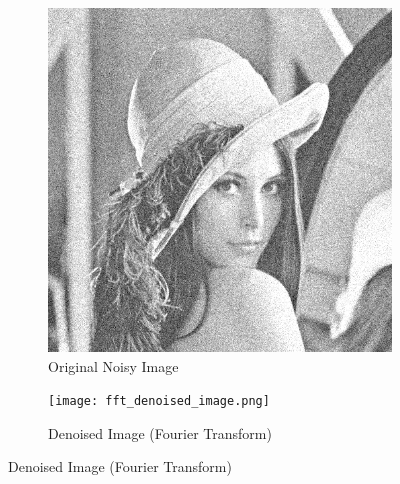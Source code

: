 \documentclass[12pt]{report}
\begin{document}
\begin{figure}[H]
    \centering
    \begin{subfigure}{0.4\textwidth}
        \centering
        \includegraphics[width=\linewidth]{Noisy_Lena.png}
        \caption{Original Noisy Image}
    \end{subfigure}
    \begin{subfigure}{0.4\textwidth}
        \centering
        \texttt{[image: fft\_denoised\_image.png]}
        \caption{Denoised Image (Fourier Transform)}
    \end{subfigure}
\end{figure}
\end{document}
